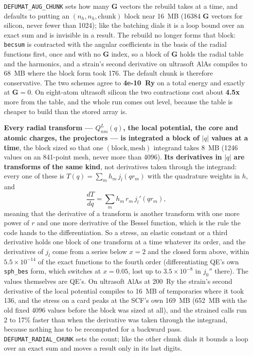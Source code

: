 \documentclass[11pt,a4paper]{article}
\newcommand{\code}[1]{\texttt{\small #1}}
\begin{document}
\code{DEFUMAT\_AUG\_CHUNK} sets how many $\mathbf G$ vectors the rebuild takes
at a time, and defaults to putting an $(n_h, n_h, \text{chunk})$ block near
16~MB (16384 $\mathbf G$ vectors for silicon, never fewer than 1024); like the
batching dials it is a loop bound over an exact sum and is invisible in a
result. The rebuild no longer forms that block: \code{becsum} is contracted
with the angular coefficients in the basis of the radial functions first, once
and with no $\mathbf G$ index, so a block of $\mathbf G$ holds the radial table
and the harmonics, and a strain's second derivative on ultrasoft AlAs compiles
to 68~MB where the block form took 176. The default chunk is therefore
conservative. The two schemes agree to \textbf{4e-10~Ry} on a total energy and
exactly at $\mathbf{G} = 0$. On eight-atom ultrasoft silicon the two
contractions cost about \textbf{4.5x} more from the table, and the whole run
comes out level, because the table is cheaper to build than the stored array
is.

\textbf{Every radial transform --- $Q^L_{nm}(q)$, the local potential, the core
and atomic charges, the projectors --- is integrated a block of $|q|$ values at a
time}, the block sized so that one $(\text{block}, \text{mesh})$ integrand
takes 8~MB (1246 values on an 841-point mesh, never more than 4096).
\textbf{Its derivatives in $|q|$ are transforms of the same kind}, not
derivatives taken through the integrand: every one of these is
$T(q) = \sum_m h_m\, j_l(q r_m)$ with the quadrature weights in $h$, and
\begin{equation*}
  \frac{dT}{dq} = \sum_m h_m\, r_m\, j_l'(q r_m),
\end{equation*}
meaning that the derivative of a transform is another transform with one more
power of $r$ and one more derivative of the Bessel function, which is the rule
the code hands to the differentiation. So a stress, an elastic constant or a
third derivative holds one block of one transform at a time whatever its
order, and the derivatives of $j_l$ come from a series below $x = 2$ and the
closed form above, within $5.5\times10^{-14}$ of the exact functions to the
fourth order (differentiating QE's own \code{sph\_bes} form, which switches at
$x = 0.05$, lost up to $3.5\times10^{-8}$ in $j_0''$ there). The values
themselves are QE's. On ultrasoft AlAs at 200~Ry the strain's second derivative
of the local potential compiles to 16~MB of temporaries where it took 136, and
the stress on a card peaks at the SCF's own 169~MB (652~MB with the old fixed
4096 values before the block was sized at all), and the strained calls run 2
to 17\% faster than when the derivative was taken through the integrand,
because nothing has to be recomputed for a backward pass. \code{DEFUMAT\_RADIAL\_CHUNK}
sets the count; like the other chunk dials it bounds a loop over an exact sum
and moves a result only in its last digits.
\end{document}
